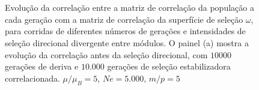 \begin{figure}[htbp]
   \centering
   \\ 
   \\ 
   \vspace{11pt}
   \caption{ Evolução da correlação entre a matriz de correlação da
       população a cada geração com a matriz de correlação da superfície
       de seleção $\omega$, para corridas de diferentes números de
       gerações e intensidades de seleção direcional divergente entre
   módulos. O painel (a) mostra a evolução da correlação antes da
   seleção direcional, com $10000$ gerações de deriva e $10.000$
   gerações de seleção estabilizadora correlacionada. $\mu/\mu_B = 5$, $Ne = 5.000$, $m/p=5$}
   \label{CorrMat}
\end{figure}

